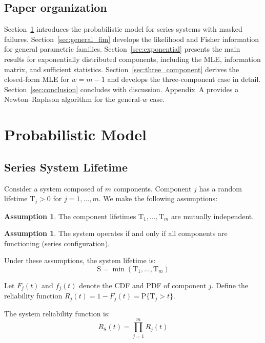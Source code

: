 \documentclass[12pt]{article}
\newcommand{\RV}[1]{\mathrm{#1}}
\newcommand{\Prob}[1]{\mathrm{P}\{#1\}}
\newcommand{\cv}{\RV{T}}           %
\newcommand{\sv}{\RV{S}}           %
\newcommand{\pdf}{f}
\newcommand{\cdf}{F}
\newcommand{\srv}{R}
\theoremstyle{definition}
\newtheorem{assumption}[theorem]{Assumption}
\theoremstyle{remark}
\begin{document}
\subsection{Paper organization}

Section~\ref{sec:model} introduces the probabilistic model for series systems with masked failures. Section~\ref{sec:general_fim} develops the likelihood and Fisher information for general parametric families. Section~\ref{sec:exponential} presents the main results for exponentially distributed components, including the MLE, information matrix, and sufficient statistics. Section~\ref{sec:three_component} derives the closed-form MLE for $w = m-1$ and develops the three-component case in detail. Section~\ref{sec:conclusion} concludes with discussion. Appendix~A provides a Newton--Raphson algorithm for the general-$w$ case.

\section{Probabilistic Model}
\label{sec:model}

\subsection{Series System Lifetime}

Consider a system composed of $m$ components. Component $j$ has a random lifetime $\cv_j > 0$ for $j = 1, \ldots, m$. We make the following assumptions:

\begin{assumption}
\label{asm:indep}
The component lifetimes $\cv_1, \ldots, \cv_m$ are mutually independent.
\end{assumption}

\begin{assumption}
\label{asm:series}
The system operates if and only if all components are functioning (series configuration).
\end{assumption}

Under these assumptions, the system lifetime is:
\begin{equation}
\label{eq:system_lifetime}
\sv = \min(\cv_1, \ldots, \cv_m)
\end{equation}

Let $\cdf_j(t)$ and $\pdf_j(t)$ denote the CDF and PDF of component $j$. Define the reliability function $\srv_j(t) = 1 - \cdf_j(t) = \Prob{\cv_j > t}$.

The system reliability function is:
\begin{equation}
\label{eq:system_reliability}
\srv_{\sv}(t) = \prod_{j=1}^{m} \srv_j(t)
\end{equation}
\end{document}
